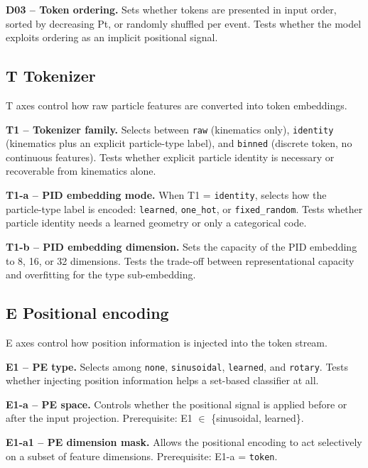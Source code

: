 \textbf{D03 -- Token ordering.} Sets whether tokens are presented in
input order, sorted by decreasing Pt, or randomly shuffled per event.
Tests whether the model exploits ordering as an implicit positional
signal.

\subsection*{T \quad Tokenizer}

T axes control how raw particle features are converted into token
embeddings.

\textbf{T1 -- Tokenizer family.} Selects between \texttt{raw}
(kinematics only), \texttt{identity} (kinematics plus an explicit
particle-type label), and \texttt{binned} (discrete token, no
continuous features). Tests whether explicit particle identity is
necessary or recoverable from kinematics alone.

\textbf{T1-a -- PID embedding mode.} When T1 = \texttt{identity},
selects how the particle-type label is encoded: \texttt{learned},
\texttt{one\_hot}, or \texttt{fixed\_random}. Tests whether particle
identity needs a learned geometry or only a categorical code.

\textbf{T1-b -- PID embedding dimension.} Sets the capacity of the
PID embedding to 8, 16, or 32 dimensions. Tests the trade-off between
representational capacity and overfitting for the type sub-embedding.

\subsection*{E \quad Positional encoding}

E axes control how position information is injected into the token
stream.

\textbf{E1 -- PE type.} Selects among \texttt{none},
\texttt{sinusoidal}, \texttt{learned}, and \texttt{rotary}. Tests
whether injecting position information helps a set-based classifier at
all.

\textbf{E1-a -- PE space.} Controls whether the positional signal is
applied before or after the input projection. Prerequisite: E1
$\in$ \{sinusoidal, learned\}.

\textbf{E1-a1 -- PE dimension mask.} Allows the positional encoding to
act selectively on a subset of feature dimensions. Prerequisite:
E1-a = \texttt{token}.

